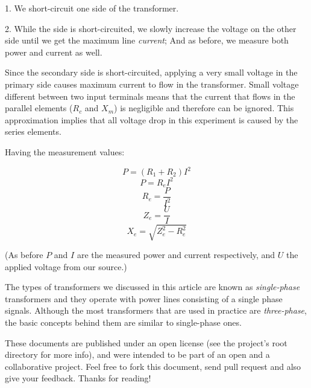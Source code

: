 \documentclass{article}
\begin{document}
	1. We short-circuit one side of the transformer.

	2. While the side is short-circuited, we slowly increase the voltage on the other side until we get the maximum line \textit{current}; And as before, we measure both power and current as well.

	Since the secondary side is short-circuited, applying a very small voltage in the primary side causes maximum current to flow in the transformer.
	Small voltage different between two input terminals means that the current that flows in the parallel elements ($R_c$ and $X_m$) is negligible and therefore can be ignored.
	This approximation implies that all voltage drop in this experiment is caused by the series elements.
	
	Having the measurement values:
	
	$$ P = (R_1 + R_2)I^2 $$
	$$ P = R_e I^2 $$
	$$ R_e = \frac{P}{I^2} $$
	$$ Z_e = \frac{U}{I} $$
	$$ X_e = \sqrt{Z_e^2 - R_e^2}$$

	(As before $P$ and $I$ are the measured power and current respectively, and $U$ the applied voltage from our source.)
	
	The types of transformers we discussed in this article are known as \textit{single-phase} transformers and they operate with power lines consisting of a single phase signals. 
	Although the most transformers that are used in practice are \textit{three-phase}, the basic concepts behind them are similar to single-phase ones.
	
	These documents are published under an open license (see the project's root directory for more info), and were intended to be part of an open and a collaborative project. Feel free to fork this document, send pull request and also give your feedback. Thanks for reading!
	
\end{document}
